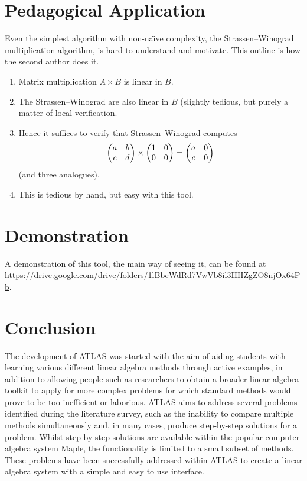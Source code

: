 \documentclass[
]{ceurart}
\begin{document}
\section{Pedagogical Application}
Even the simplest algorithm with non-na\"\i{}ve complexity, the Strassen--Winograd multiplication algorithm, is hard to understand and motivate. This outline is how the second author does it.
\begin{enumerate}
\item Matrix multiplication $A\times B$ is linear in $B$.
\item The Strassen--Winograd are also linear in $B$ (slightly tedious, but purely a matter of local verification.
\item Hence it suffices to verify that Strassen--Winograd  computes
$$
\begin{pmatrix}
a&b\cr c&d
\end{pmatrix}\times
\begin{pmatrix}
1&0\cr0&0
\end{pmatrix}
=\begin{pmatrix}
a&0\cr c&0
\end{pmatrix}
$$
(and three analogues).
\item This is tedious by hand, but easy with this tool.
\end{enumerate}
\section{Demonstration}
A demonstration of this tool, the main way of seeing it, can be found at \hfil\break\url{https://drive.google.com/drive/folders/1lBbcWdRd7VwVb8il3HHZgZO8njOx64Pb}.

\section{Conclusion}
The development of ATLAS was started with the aim of aiding students with learning various different linear algebra methods through active examples, in addition to allowing people such as researchers to obtain a broader linear algebra toolkit to apply for more complex problems for which standard methods would prove to be too inefficient or laborious. ATLAS aims to address several problems identified during the literature survey, such as the inability to compare multiple methods simultaneously and, in many cases, produce step-by-step solutions for a problem. Whilst step-by-step solutions are available within the popular computer algebra system Maple, the functionality is limited to a small subset of methods. These problems have been successfully addressed within ATLAS to create a linear algebra system with a simple and easy to use interface.
\end{document}
